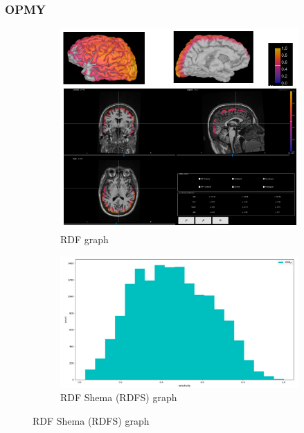 \documentclass{beamer}
\numberwithin{figure}{section}
\numberwithin{equation}{section}
\begin{document}

\section{}
\begin{frame}
 \frametitle{OPMY}
  

 	\begin{figure}[h]
        \begin{subfigure}[h]{0.53\linewidth} 
            \includegraphics[width=\linewidth]{pictures/OPMY1}
            \caption{\tiny RDF graph}
            \label{fig:rdf_graph}
        \end{subfigure}       
        \begin{subfigure}[h]{0.45\linewidth} 
            \includegraphics[width=\linewidth]{pictures/HISTopmy0}
            \caption{\tiny RDF Shema (RDFS) graph}
            \label{fig:rdfs_graph}
        \end{subfigure}
    \end{figure}

  
\end{frame}
\end{document}
